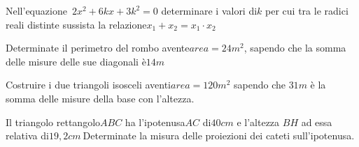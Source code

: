 \begin{esercizio}
 \label{ese:3.80}
Nell'equazione~\(2 x^{2} + 6 k x + 3 k^{2} = 0\) determinare i valori di\(k\) 
per 
cui tra le radici reali distinte sussista la relazione\(x_{1} + x_{2} = 
x_{1} 
\cdot x_{2}\)
\end{esercizio}

\begin{esercizio}
 \label{ese:3.81}
Determinate il perimetro del rombo avente\(area = 24\unit{m^{2}}\), sapendo 
che 
la somma delle misure delle sue diagonali è\(14\unit{m}\)
\end{esercizio}

\begin{esercizio}
\label{ese:3.82}
Costruire i due triangoli isosceli aventi\(area = 120\unit{m^{2}}\) sapendo 
che 
\(31\unit{m}\) è la somma delle misure della base con l'altezza.
\end{esercizio}

\begin{esercizio}
 \label{ese:3.83}
Il triangolo rettangolo\(ABC\) ha l'ipotenusa\(AC\) di\(40\unit{cm}\) e l'altezza 
\(BH\) ad essa relativa di\(19,2\unit{cm}~\)Determinate la misura delle 
proiezioni 
dei cateti sull'ipotenusa.
\end{esercizio}

\subsection*{}

